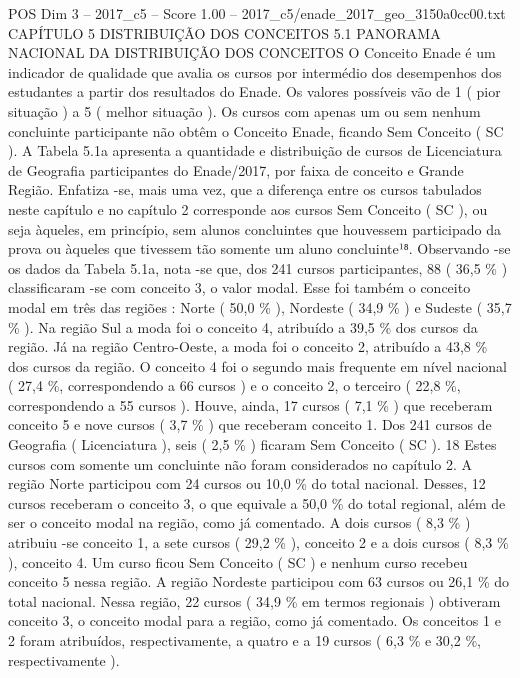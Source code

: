 \begin{textsample}{POS Dim 3 – 2017\_c5 – Score 1.00 – 2017\_c5/enade\_2017\_geo\_3150a0cc00.txt}  \label{ex:f3_pos_223}
CAPÍTULO 5 DISTRIBUIÇÃO DOS CONCEITOS 5.1 PANORAMA NACIONAL DA DISTRIBUIÇÃO DOS CONCEITOS O Conceito Enade é um indicador de qualidade que avalia os cursos por intermédio dos desempenhos dos estudantes a partir dos resultados do Enade.
Os valores possíveis vão de 1 ( pior situação ) a 5 ( melhor situação ).
Os cursos com apenas um ou sem nenhum concluinte participante não obtêm o Conceito Enade, ficando Sem Conceito ( SC ).
A Tabela 5.1a apresenta a quantidade e distribuição de cursos de Licenciatura de Geografia participantes do Enade/2017, por faixa de conceito e Grande Região.
Enfatiza -se, mais uma vez, que a diferença entre os cursos tabulados neste capítulo e no capítulo 2 corresponde aos cursos Sem Conceito ( SC ), ou seja àqueles, em princípio, sem alunos concluintes que houvessem participado da prova ou àqueles que tivessem tão somente um aluno concluinte¹⁸.
Observando -se os dados da Tabela 5.1a, nota -se que, dos 241 cursos participantes, 88 ( 36,5 \% ) classificaram -se com conceito 3, o valor modal.
Esse foi também o conceito modal em três das regiões : Norte ( 50,0 \% ), Nordeste ( 34,9 \% ) e Sudeste ( 35,7 \% ).
Na região Sul a moda foi o conceito 4, atribuído a 39,5 \% dos cursos da região.
Já na região Centro-Oeste, a moda foi o conceito 2, atribuído a 43,8 \% dos cursos da região.
O conceito 4 foi o segundo mais frequente em nível nacional ( 27,4 \%, correspondendo a 66 cursos ) e o conceito 2, o terceiro ( 22,8 \%, correspondendo a 55 cursos ).
Houve, ainda, 17 cursos ( 7,1 \% ) que receberam conceito 5 e nove cursos ( 3,7 \% ) que receberam conceito 1.
Dos 241 cursos de Geografia ( Licenciatura ), seis ( 2,5 \% ) ficaram Sem Conceito ( SC ). 18 Estes cursos com somente um concluinte não foram considerados no capítulo 2.
A região Norte participou com 24 cursos ou 10,0 \% do total nacional.
Desses, 12 cursos receberam o conceito 3, o que equivale a 50,0 \% do total regional, além de ser o conceito modal na região, como já comentado.
A dois cursos ( 8,3 \% ) atribuiu -se conceito 1, a sete cursos ( 29,2 \% ), conceito 2 e a dois cursos ( 8,3 \% ), conceito 4.
Um curso ficou Sem Conceito ( SC ) e nenhum curso recebeu conceito 5 nessa região.
A região Nordeste participou com 63 cursos ou 26,1 \% do total nacional.
Nessa região, 22 cursos ( 34,9 \% em termos regionais ) obtiveram conceito 3, o conceito modal para a região, como já comentado.
Os conceitos 1 e 2 foram atribuídos, respectivamente, a quatro e a 19 cursos ( 6,3 \% e 30,2 \%, respectivamente ).

\end{textsample}
